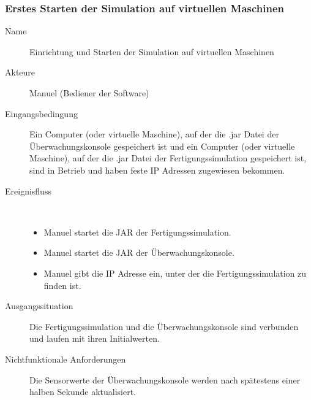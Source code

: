 \documentclass[parskip=full]{scrartcl}
\begin{document}
\subsubsection{Erstes Starten der Simulation auf virtuellen Maschinen}
\begin{description}
 \item[Name] Einrichtung und Starten der Simulation auf virtuellen Maschinen
 \item[Akteure] Manuel (Bediener der Software)
 \item[Eingangsbedingung] Ein Computer (oder virtuelle Maschine), auf der die .jar Datei der Überwachungskonsole gespeichert ist und ein Computer (oder virtuelle Maschine), auf der die .jar
 Datei der Fertigungssimulation gespeichert ist, sind in Betrieb und haben feste IP Adressen zugewiesen bekommen.
 \item[Ereignisfluss]~\\
 \begin{itemize}[noitemsep]
  \item Manuel startet die JAR der Fertigungssimulation.
  \item Manuel startet die JAR der Überwachungskonsole.
  \item Manuel gibt die IP Adresse ein, unter der die Fertigungssimulation zu finden ist.
 \end{itemize}
 \item[Ausgangssituation] Die Fertigungssimulation und die Überwachungskonsole sind verbunden und laufen mit ihren Initialwerten.
 \item[Nichtfunktionale Anforderungen] Die Sensorwerte der Überwachungskonsole werden nach spätestens einer halben Sekunde aktualisiert.
\end{description}
 
\end{document}
